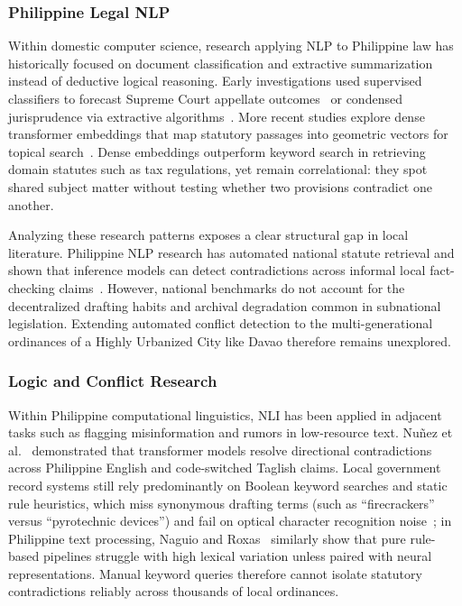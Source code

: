         \subsubsection{Philippine Legal NLP}
        Within domestic computer science, research applying NLP to Philippine law has historically focused on document classification and extractive summarization instead of deductive logical reasoning. Early investigations used supervised classifiers to forecast Supreme Court appellate outcomes~\cite{virtucio2018predicting} or condensed jurisprudence via extractive algorithms~\cite{sagum2023philippine}. More recent studies explore dense transformer embeddings that map statutory passages into geometric vectors for topical search~\cite{roque2024legal}. Dense embeddings outperform keyword search in retrieving domain statutes such as tax regulations, yet remain correlational: they spot shared subject matter without testing whether two provisions contradict one another.

        Analyzing these research patterns exposes a clear structural gap in local literature. Philippine NLP research has automated national statute retrieval and shown that inference models can detect contradictions across informal local fact-checking claims~\cite{virtucio2018predicting, sagum2023philippine, roque2024legal, nunez2026pomi}. However, national benchmarks do not account for the decentralized drafting habits and archival degradation common in subnational legislation. Extending automated conflict detection to the multi-generational ordinances of a Highly Urbanized City like Davao therefore remains unexplored.

        \subsubsection{Logic and Conflict Research}
        Within Philippine computational linguistics, NLI has been applied in adjacent tasks such as flagging misinformation and rumors in low-resource text. Nu\~nez et al.~\cite{nunez2026pomi} demonstrated that transformer models resolve directional contradictions across Philippine English and code-switched Taglish claims. Local government record systems still rely predominantly on Boolean keyword searches and static rule heuristics, which miss synonymous drafting terms (such as ``firecrackers'' versus ``pyrotechnic devices'') and fail on optical character recognition noise~\cite{lopresti2008optical}; in Philippine text processing, Naguio and Roxas~\cite{naguio2024hybrid} similarly show that pure rule-based pipelines struggle with high lexical variation unless paired with neural representations. Manual keyword queries therefore cannot isolate statutory contradictions reliably across thousands of local ordinances.

